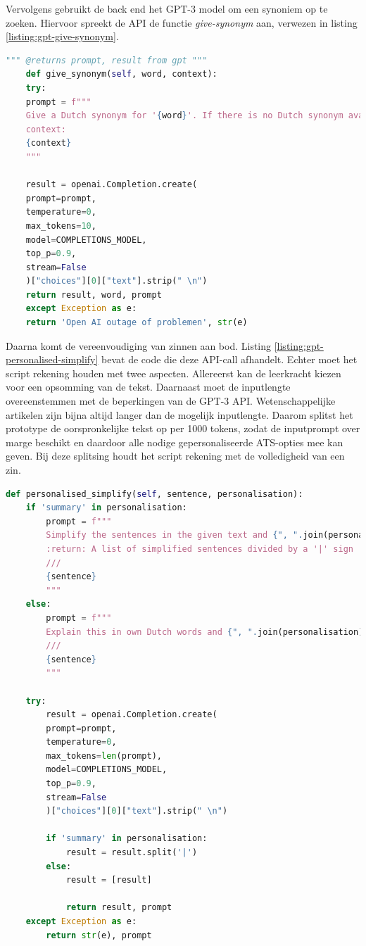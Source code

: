 Vervolgens gebruikt de back end het GPT-3 model om een synoniem op te zoeken. Hiervoor spreekt de API de functie \textit{give-synonym} aan, verwezen in listing \ref{listing:gpt-give-synonym}.

\begin{lstlisting}[language=Python, caption={Een synoniem genereren of ophalen met GPT-3.}, label={listing:gpt-give-synonym}]
	""" @returns prompt, result from gpt """
	def give_synonym(self, word, context):
	try:
	prompt = f"""
	Give a Dutch synonym for '{word}'. If there is no Dutch synonym available, explain it between curly brackets.
	context:
	{context}
	"""
	
	result = openai.Completion.create(
	prompt=prompt,
	temperature=0,
	max_tokens=10,
	model=COMPLETIONS_MODEL,
	top_p=0.9,
	stream=False
	)["choices"][0]["text"].strip(" \n")    
	return result, word, prompt
	except Exception as e:
	return 'Open AI outage of problemen', str(e)
\end{lstlisting}
	
Daarna komt de vereenvoudiging van zinnen aan bod. Listing \ref{listing:gpt-personalised-simplify} bevat de code die deze API-call afhandelt. Echter moet het script rekening houden met twee aspecten. Allereerst kan de leerkracht kiezen voor een opsomming van de tekst. Daarnaast moet de inputlengte overeenstemmen met de beperkingen van de GPT-3 API. Wetenschappelijke artikelen zijn bijna altijd langer dan de mogelijk inputlengte. Daarom splitst het prototype de oorspronkelijke tekst op per 1000 tokens, zodat de inputprompt over marge beschikt en daardoor alle nodige gepersonaliseerde ATS-opties mee kan geven. Bij deze splitsing houdt het script rekening met de volledigheid van een zin. 
	
\begin{lstlisting}[language=Python, caption={Een zin gepersonaliseerd vereenvoudigen met GPT-3.}, label={listing:gpt-personalised-simplify}]
def personalised_simplify(self, sentence, personalisation):
	if 'summary' in personalisation:
		prompt = f"""
		Simplify the sentences in the given text and {", ".join(personalisation)}
		:return: A list of simplified sentences divided by a '|' sign
		///
		{sentence}
		"""
	else:
		prompt = f"""
		Explain this in own Dutch words and {", ".join(personalisation)}
		///
		{sentence}
		"""
	
	try:
		result = openai.Completion.create(
		prompt=prompt,
		temperature=0,
		max_tokens=len(prompt),
		model=COMPLETIONS_MODEL,
		top_p=0.9,
		stream=False
		)["choices"][0]["text"].strip(" \n")
		
		if 'summary' in personalisation:
			result = result.split('|')
		else:
			result = [result]
			
			return result, prompt
	except Exception as e:
		return str(e), prompt 
\end{lstlisting}


